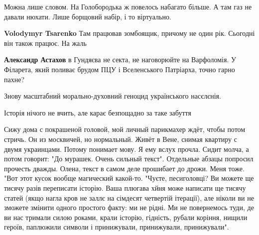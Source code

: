 \begin{itemize}
\begin{itemize}
 
Можна лише словом. На Голобородька ж повелось набагато більше. А там газ не давали нюхати. Лише борщовий набір, і то віртуально.

 
\textbf{Volodymyr Tsarenko} Там працював зомбоящик, причому не один рік. Сьогодні він також працює. На жаль

 
\textbf{Александр Астахов} в Гундяєва не секта, не наговорюйте на Варфоломія. У Філарета, який поливає брудом ПЦУ і Вселенського Патріарха, точно гарно пахне?
\end{itemize}

 

Знову масштабний морально-духовний геноцид українського насєлєнія.

Історія нічого не вчить, але карає безпощадно за таке забуття


 

Сижу дома с покрашеной головой, мой личный парикмахер ждёт, чтобы потом стричь.
Он из москвичей, но нормальный. Живёт в Вене, снимая квартиру с двумя
украинцами. Потому понимает мову. Я ему вслух прочла. Сидит молча, а потом
говорит: "До мурашек. Очень сильный текст". Отдельные абзацы попросил прочесть
дважды. Олена, текст в самом деле прошибает до дрожи. Меня тоже. "Вот этот
кусок вообще магический какой-то. "Чуєте, песиголовці? Ви можете ще тисячу
разів переписати історію. Ваша плюгава хйня може написати ще тисячу статей
(якщо нагла кров не заллє на сімдесят четвертій ітерації), але ніколи ви не
зможете змінити одного простого факту: ми не рідні. Ми не повернемось туди, де
ви нас тримали силою роками, крали історію, гідність, рубали коріння, нищили
героїв, паплюжили символи і принижували, принижували, принижували".


\end{itemize}
